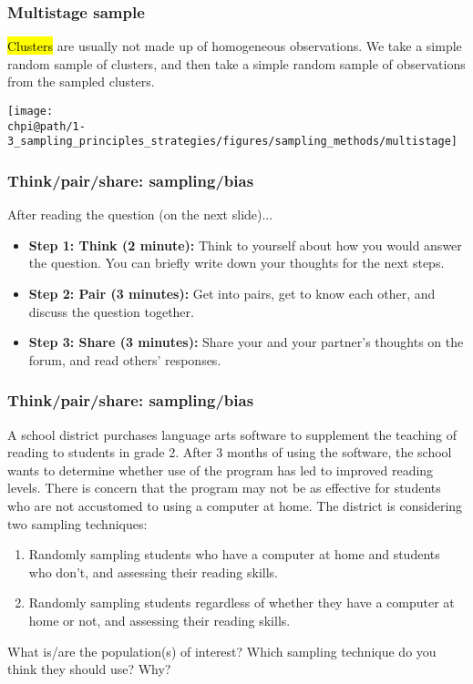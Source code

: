 \documentclass[slidestop,compress,mathserif]{beamer}
\makeatletter
\def\chpi@path{../../Chp 1}  %
\makeatother
\begin{document}

\begin{frame}
	\frametitle{Multistage sample}

	\hl{Clusters} are usually not made up of homogeneous observations.  We take a simple random sample of clusters, and then take a simple random sample of observations from the sampled clusters.

	\begin{center}
	\texttt{[image: \\chpi@path/1-3\_sampling\_principles\_strategies/figures/sampling\_methods/multistage]}
	\end{center}

\end{frame}


\begin{frame}
	\frametitle{Think/pair/share: sampling/bias}

	After reading the question (on the next slide)...

	\begin{itemize}
		\item \textbf{Step 1: Think (2 minute):} Think to yourself about how you would answer the question. You can briefly write down your thoughts for the next steps.
		\item \textbf{Step 2: Pair (3 minutes):} Get into pairs, get to know each other, and discuss the question together. 
		\item \textbf{Step 3: Share (3 minutes):} Share your and your partner's thoughts on the forum, and read others' responses.
	\end{itemize}
\end{frame}

\begin{frame}
	\frametitle{Think/pair/share: sampling/bias}

	A school district purchases language arts software to supplement the teaching of reading to students in grade 2. 
	After 3 months of using the software, the school wants to determine whether use of the program has led to improved reading levels. 
	There is concern that the program may not be as effective for students who are not accustomed to using a computer at home. 
	The district is considering two sampling techniques:

	\begin{enumerate}
		\item Randomly sampling students who have a computer at home and students who don't, and assessing their reading skills. 
		\item Randomly sampling students regardless of whether they have a computer at home or not, and assessing their reading skills. 
	\end{enumerate}

	What is/are the population(s) of interest? Which sampling technique do you think they should use? Why?
\end{frame}
\end{document}
